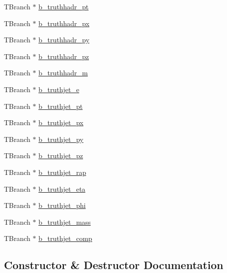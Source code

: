 \begin{DoxyCompactItemize}
T\+Branch $\ast$ \hyperlink{classJetAnalysisExample_ab571b5c9239ddc609ef8cfc68e8ee550}{b\+\_\+truthhadr\+\_\+pt}
\item 
T\+Branch $\ast$ \hyperlink{classJetAnalysisExample_a162462b6fa72553a9671235c6d0daece}{b\+\_\+truthhadr\+\_\+px}
\item 
T\+Branch $\ast$ \hyperlink{classJetAnalysisExample_a41246f1d1d0ba626568426ebea30b124}{b\+\_\+truthhadr\+\_\+py}
\item 
T\+Branch $\ast$ \hyperlink{classJetAnalysisExample_a7c59fcb2279f56edfaf367adc7693043}{b\+\_\+truthhadr\+\_\+pz}
\item 
T\+Branch $\ast$ \hyperlink{classJetAnalysisExample_a73ceb7817db9bf80ffe77301c412fa68}{b\+\_\+truthhadr\+\_\+m}
\item 
T\+Branch $\ast$ \hyperlink{classJetAnalysisExample_af6be0e5fa6160a130c8e1f17bf724f59}{b\+\_\+truthjet\+\_\+e}
\item 
T\+Branch $\ast$ \hyperlink{classJetAnalysisExample_a437117b34568dd29784b94fb1dd5647f}{b\+\_\+truthjet\+\_\+pt}
\item 
T\+Branch $\ast$ \hyperlink{classJetAnalysisExample_ac76803ca9aa716af0bc10adab61ee679}{b\+\_\+truthjet\+\_\+px}
\item 
T\+Branch $\ast$ \hyperlink{classJetAnalysisExample_af632a405f965ff196075029c68f2bdb9}{b\+\_\+truthjet\+\_\+py}
\item 
T\+Branch $\ast$ \hyperlink{classJetAnalysisExample_aff985af4469f14090938099931db1e20}{b\+\_\+truthjet\+\_\+pz}
\item 
T\+Branch $\ast$ \hyperlink{classJetAnalysisExample_a9bf47046ea983e12faf03ad564ec714e}{b\+\_\+truthjet\+\_\+rap}
\item 
T\+Branch $\ast$ \hyperlink{classJetAnalysisExample_ac0de35b569a9a006ff0b93361987aede}{b\+\_\+truthjet\+\_\+eta}
\item 
T\+Branch $\ast$ \hyperlink{classJetAnalysisExample_a3a4d9acb02a2ed47df9059a305f226c5}{b\+\_\+truthjet\+\_\+phi}
\item 
T\+Branch $\ast$ \hyperlink{classJetAnalysisExample_ad92c6fe2ef806329f5b6d3dfb07b4394}{b\+\_\+truthjet\+\_\+mass}
\item 
T\+Branch $\ast$ \hyperlink{classJetAnalysisExample_a28bae60c2d5832509d2371a238915ff5}{b\+\_\+truthjet\+\_\+comp}
\end{DoxyCompactItemize}


\subsection{Constructor \& Destructor Documentation}

